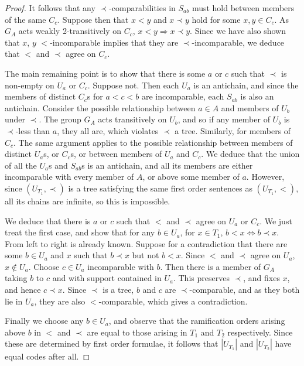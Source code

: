 \documentclass[a4paper,reqno]{amsart}
\numberwithin{equation}{section}
\begin{document}
\begin{proof}
It follows that any $\prec$-comparabilities in $S_{ab}$ must hold between members of the same $C_c$. Suppose then that
$x < y$ and $x \prec y$ hold for some $x, y \in C_c$. As $G_A$ acts weakly 2-transitively on $C_c$, $x < y \Rightarrow x \prec y$. 
Since we have also shown that $x$, $y$ $<$-incomparable implies that they are $\prec$-incomparable, we deduce that $<$ and $\prec$
agree on $C_c$. 

The main remaining point is to show that there is some $a$ or $c$ such that $\prec$ is non-empty on $U_a$ or $C_c$. Suppose not. Then
each $U_a$ is an antichain, and since the members of distinct $C_c$s for $a < c < b$ are incomparable, each $S_{ab}$ is also an
antichain. Consider the possible relationship between $a \in A$ and members of $U_b$ under $\prec$. The group $G_A$ acts transitively 
on $U_b$, and so if any member of $U_b$ is $\prec$-less than $a$, they all are, which violates $\prec$ a tree. Similarly, for members
of $C_c$. The same argument applies to the possible relationship between members of distinct $U_a$s, or $C_c$s, or between members 
of $U_a$ and $C_c$. We deduce that the union of all the $U_a$s and $S_{ab}$s is an antichain, and all its members are either 
incomparable with every member of $A$, or above some member of $a$. However, since $(U_{T_1}, \prec)$ is a tree satisfying the
same first order sentences as $(U_{T_1}, <)$, all its chains are infinite, so this is impossible.

We deduce that there is $a$ or $c$ such that $<$ and $\prec$ agree on $U_a$ or $C_c$. We just treat the first case, and show that 
for any $b \in U_a$, for $x \in T_1$, $b < x \Leftrightarrow b \prec x$. From left to right is already known. Suppose for a 
contradiction that there are some $b \in U_a$ and $x$ such that $b \prec x$ but not $b < x$. Since $<$ and $\prec$ agree on $U_a$, 
$x \not \in U_a$. Choose $c \in U_a$ incomparable with $b$. Then there is a member of $G_A$ taking $b$ to $c$ and with support 
contained in $U_a$. This preserves $\prec$, and fixes $x$, and hence $c \prec x$. Since $\prec$ is a tree, $b$ and $c$ are 
$\prec$-comparable, and as they both lie in $U_a$, they are also $<$-comparable, which gives a contradiction.

Finally we choose any $b \in U_a$, and observe that the ramification orders arising above $b$ in $<$ and $\prec$ are equal to those
arising in $T_1$ and $T_2$ respectively. Since these are determined by first order formulae, it follows that $|U_{T_1}|$ and $|U_{T_2}|$ 
have equal codes after all.  \end{proof}
\end{document}
